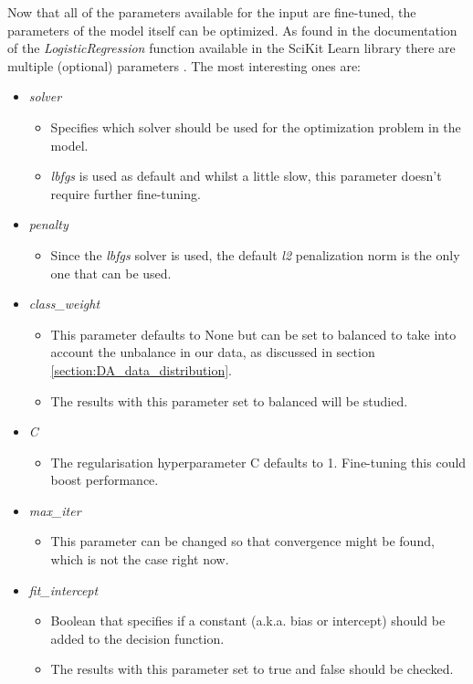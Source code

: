 Now that all of the parameters available for the input are fine-tuned, the parameters of the model itself can be optimized.
As found in the documentation of the \emph{LogisticRegression} function available in the SciKit Learn library there are multiple (optional) parameters \citep{scikit_learn}.
The most interesting ones are:
\begin{itemize}
    \item \emph{solver}
    \begin{itemize}
        \item Specifies which solver should be used for the optimization problem in the model.
        \item \emph{lbfgs} is used as default and whilst a little slow, this parameter doesn't require further fine-tuning.
    \end{itemize}
    \item \emph{penalty}
    \begin{itemize}
        \item Since the \emph{lbfgs} solver is used, the default \emph{l2} penalization norm is the only one that can be used.
    \end{itemize}
    \item \emph{class\_weight}
    \begin{itemize}
        \item This parameter defaults to None but can be set to balanced to take into account the unbalance in our data, as discussed in section \ref{section:DA_data_distribution}.
        \item The results with this parameter set to balanced will be studied.
    \end{itemize}
    \item \emph{C}
    \begin{itemize}
        \item The regularisation hyperparameter C defaults to 1. Fine-tuning this could boost performance.
    \end{itemize}
    \item \emph{max\_iter}
    \begin{itemize}
        \item This parameter can be changed so that convergence might be found, which is not the case right now.
    \end{itemize}
    \item \emph{fit\_intercept}
    \begin{itemize}
        \item Boolean that specifies if a constant (a.k.a. bias or intercept) should be added to the decision function.
        \item The results with this parameter set to true and false should be checked.
    \end{itemize}
\end{itemize}


